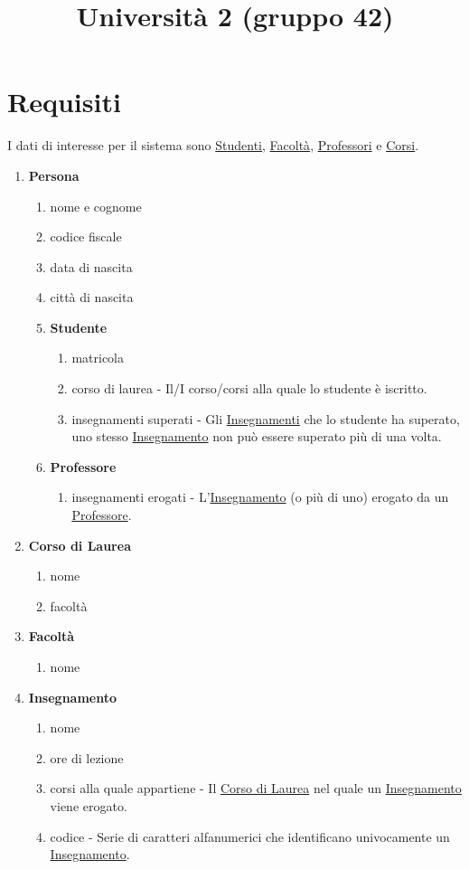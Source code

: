 \documentclass[12pt, letterpaper]{article}
\title{Università 2 (gruppo 42)}
\date{}
\begin{document}
\maketitle


\section{Requisiti}
I dati di interesse per il sistema sono \underline{Studenti}, \underline{Facoltà}, \underline{Professori} e \underline{Corsi}.
\begin{enumerate}
    \item \textbf{Persona}\begin{enumerate}
        \item nome e cognome
        \item codice fiscale
        \item data di nascita 
        \item città di nascita 
    \item \textbf{Studente}\begin{enumerate}
        \item matricola 
        \item corso di laurea - Il/I corso/corsi alla quale lo studente è iscritto.
        \item insegnamenti superati - Gli \underline{Insegnamenti} che lo studente ha superato, uno stesso \underline{Insegnamento} non può essere 
        superato più di una volta.
    \end{enumerate}
    \item \textbf{Professore}\begin{enumerate}
        \item insegnamenti erogati - L'\underline{Insegnamento} (o più di uno) erogato da un \underline{Professore}.
    \end{enumerate}
\end{enumerate}
    \item \textbf{Corso di Laurea}\begin{enumerate}
        \item nome 
        \item facoltà
    \end{enumerate}
    \item \textbf{Facoltà}\begin{enumerate}
        \item nome
    \end{enumerate}
    \item \textbf{Insegnamento}\begin{enumerate}
        \item nome 
        \item ore di lezione 
        \item corsi alla quale appartiene - Il \underline{Corso di Laurea} nel quale un \underline{Insegnamento} viene erogato.
        \item codice -  Serie di caratteri alfanumerici che identificano univocamente un \underline{Insegnamento}.
    \end{enumerate}
\end{enumerate}
\newpage
\end{document}
